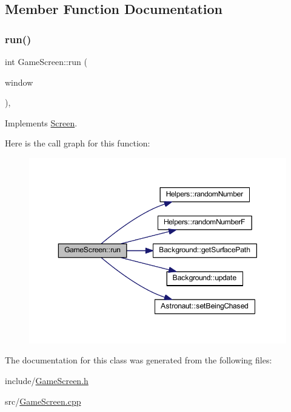 \subsection{Member Function Documentation}
\mbox{\label{class_game_screen_a0e39ba2968e5fcec952119f7a9d6e437}} 
\subsubsection{\texorpdfstring{run()}{run()}}
{\footnotesize\ttfamily int Game\+Screen\+::run (\begin{DoxyParamCaption}\item[{sf\+::\+Render\+Window \&}]{window }\end{DoxyParamCaption})\hspace{0.3cm}{\ttfamily [override]}, {\ttfamily [virtual]}}



Implements \hyperlink{class_screen_aac0f7f072481e517dafc85ad292d6f00}{Screen}.

Here is the call graph for this function\+:
\nopagebreak
\begin{figure}[H]
\begin{center}
\leavevmode
\includegraphics[width=350pt]{class_game_screen_a0e39ba2968e5fcec952119f7a9d6e437_cgraph}
\end{center}
\end{figure}


The documentation for this class was generated from the following files\+:\begin{DoxyCompactItemize}
\item 
include/\hyperlink{_game_screen_8h}{Game\+Screen.\+h}\item 
src/\hyperlink{_game_screen_8cpp}{Game\+Screen.\+cpp}\end{DoxyCompactItemize}
